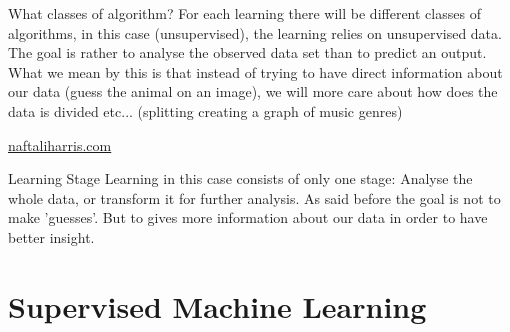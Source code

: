 \begin{parag}{What classes of algorithm?}
    For each learning there will be different classes of algorithms, in this case (unsupervised), the learning relies on unsupervised data. The goal is rather to analyse the observed data set than to predict an output.\\
	What we mean by this is that instead of trying to have direct information about our data (guess the animal on an image), we will more care about how does the data is divided etc... (splitting creating a graph of music genres)

	\begin{center}
		\href{https://www.naftaliharris.com/blog/visualizing-k-means-clustering/}{naftaliharris.com}
	\end{center}
\end{parag}
\begin{parag}{Learning Stage}
    Learning in this case consists of only one stage: Analyse the whole data, or transform it for further analysis. As said before the goal is not to make 'guesses'. But to gives more  information about our data in order to have better insight.
\end{parag}


\chapter{Supervised Machine Learning}

